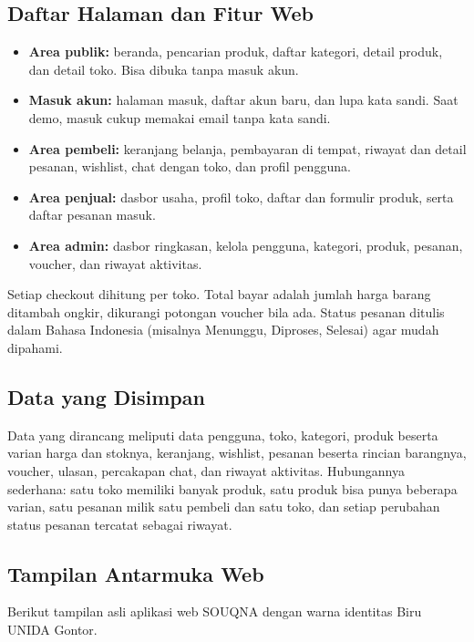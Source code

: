 \documentclass[11pt, a4paper]{article}
\begin{document}
\subsection{Daftar Halaman dan Fitur Web}

\begin{itemize}
  \item \textbf{Area publik:} beranda, pencarian produk, daftar kategori, detail produk, dan detail toko. Bisa dibuka tanpa masuk akun.
  \item \textbf{Masuk akun:} halaman masuk, daftar akun baru, dan lupa kata sandi. Saat demo, masuk cukup memakai email tanpa kata sandi.
  \item \textbf{Area pembeli:} keranjang belanja, pembayaran di tempat, riwayat dan detail pesanan, wishlist, chat dengan toko, dan profil pengguna.
  \item \textbf{Area penjual:} dasbor usaha, profil toko, daftar dan formulir produk, serta daftar pesanan masuk.
  \item \textbf{Area admin:} dasbor ringkasan, kelola pengguna, kategori, produk, pesanan, voucher, dan riwayat aktivitas.
\end{itemize}

Setiap checkout dihitung per toko. Total bayar adalah jumlah harga barang ditambah ongkir, dikurangi potongan voucher bila ada. Status pesanan ditulis dalam Bahasa Indonesia (misalnya Menunggu, Diproses, Selesai) agar mudah dipahami.

\subsection{Data yang Disimpan}

Data yang dirancang meliputi data pengguna, toko, kategori, produk beserta varian harga dan stoknya, keranjang, wishlist, pesanan beserta rincian barangnya, voucher, ulasan, percakapan chat, dan riwayat aktivitas. Hubungannya sederhana: satu toko memiliki banyak produk, satu produk bisa punya beberapa varian, satu pesanan milik satu pembeli dan satu toko, dan setiap perubahan status pesanan tercatat sebagai riwayat.

\subsection{Tampilan Antarmuka Web}

Berikut tampilan asli aplikasi web SOUQNA dengan warna identitas Biru UNIDA Gontor.
\end{document}

